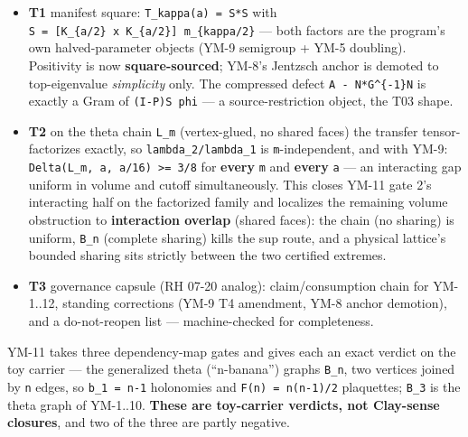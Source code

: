 \begin{itemize}
\tightlist
\item
  \textbf{T1} manifest square: \texttt{T\_kappa(a)\ =\ S*S} with
  \texttt{S\ =\ {[}K\_\{a/2\}\ x\ K\_\{a/2\}{]}\ m\_\{kappa/2\}} --- both factors are the program's
  own halved-parameter objects (YM-9 semigroup + YM-5 doubling).
  Positivity is now \textbf{square-sourced}; YM-8's Jentzsch anchor is demoted
  to top-eigenvalue \emph{simplicity} only. The compressed defect
  \texttt{A\ -\ N*G\^{}\{-1\}N} is exactly a Gram of \texttt{(I-P)S\ phi} --- a source-restriction
  object, the T03 shape.
\item
  \textbf{T2} on the theta chain \texttt{L\_m} (vertex-glued, no shared faces) the
  transfer tensor-factorizes exactly, so \texttt{lambda\_2/lambda\_1} is
  \texttt{m}-independent, and with YM-9: \texttt{Delta(L\_m,\ a,\ a/16)\ \textgreater{}=\ 3/8} for
  \textbf{every} \texttt{m} and \textbf{every} \texttt{a} --- an interacting gap uniform in volume
  and cutoff simultaneously. This closes YM-11 gate 2's interacting half
  on the factorized family and localizes the remaining volume obstruction
  to \textbf{interaction overlap} (shared faces): the chain (no sharing) is
  uniform, \texttt{B\_n} (complete sharing) kills the sup route, and a physical
  lattice's bounded sharing sits strictly between the two certified
  extremes.
\item
  \textbf{T3} governance capsule (RH 07-20 analog): claim/consumption chain for
  YM-1..12, standing corrections (YM-9 T4 amendment, YM-8 anchor
  demotion), and a do-not-reopen list --- machine-checked for completeness.
\end{itemize}

YM-11 takes three dependency-map gates and gives each an exact verdict on
the toy carrier --- the generalized theta (``n-banana'') graphs \texttt{B\_n}, two
vertices joined by \texttt{n} edges, so \texttt{b\_1\ =\ n-1} holonomies and
\texttt{F(n)\ =\ n(n-1)/2} plaquettes; \texttt{B\_3} is the theta graph of YM-1..10.
\textbf{These are toy-carrier verdicts, not Clay-sense closures}, and two of
the three are partly negative.

